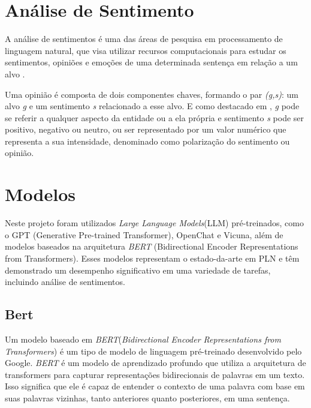 \section{Análise de Sentimento}
\label{cap:fund_teorica:sec:analise_sentimento}
A análise de sentimentos é uma das áreas de pesquisa em processamento de linguagem natural, que visa utilizar recursos computacionais para estudar os sentimentos, opiniões e emoções de uma determinada sentença em relação a um alvo \cite{Bellini2019}.

Uma opinião é composta de dois componentes chaves, formando o par \emph{(g,s)}: um alvo \emph{g} e um sentimento \emph{s} relacionado a esse alvo. E como destacado em \cite{Machado2018}, \emph{g} pode se referir a qualquer aspecto da entidade ou a ela própria e sentimento \emph{s} pode ser positivo, negativo ou neutro, ou ser representado por um valor numérico que representa a sua intensidade, denominado como polarização do sentimento ou opinião.



\section{Modelos}
\label{cap:fund_teorica:sec:modelos}


Neste projeto foram utilizados \emph{Large Language Models}(LLM) pré-treinados, como o GPT (Generative Pre-trained Transformer), OpenChat e Vicuna, além de modelos baseados na arquitetura \emph{BERT} (Bidirectional Encoder Representations from Transformers)\cite{hugoZanini2021mediu}. Esses modelos representam o estado-da-arte em PLN e têm demonstrado um desempenho significativo em uma variedade de tarefas, incluindo análise de sentimentos.

\subsection[Bert]{Bert}
\label{cap:fund_teorica:sec:modelos:subsec:bert}

Um modelo baseado em \emph{BERT}(\textit{Bidirectional Encoder Representations from Transformers}) é um tipo de modelo de linguagem pré-treinado desenvolvido pelo Google. \emph{BERT} é um modelo de aprendizado profundo que utiliza a arquitetura de transformers para capturar representações bidirecionais de palavras em um texto. Isso significa que ele é capaz de entender o contexto de uma palavra com base em suas palavras vizinhas, tanto anteriores quanto posteriores, em uma sentença.

